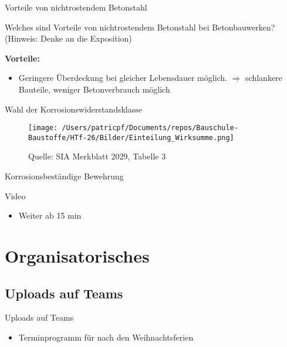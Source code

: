 \begin{frame}{Vorteile von nichtrostendem Betonstahl}
\begin{Fragenblock}
    Welches sind Vorteile von nichtrostendem Betonstahl bei Betonbauwerken? (Hinweis: Denke an die Exposition)
\end{Fragenblock}

\pause

\begin{myLösung}
    \textbf{Vorteile:}
    \begin{itemize}
        \item[\faCheckSquare] Geringere Überdeckung bei gleicher Lebensdauer möglich. $\Rightarrow$ schlankere Bauteile, weniger Betonverbrauch möglich
    \end{itemize}
\end{myLösung}
\end{frame}

\begin{frame}{Wahl der Korrosionswiderstandsklasse}

    \begin{figure}[h!bt]
        \centering
        \texttt{[image: /Users/patricpf/Documents/repos/Bauschule-Baustoffe/HTf-26/Bilder/Einteilung\_Wirksumme.png]}
        \caption{Quelle: SIA Merkblatt 2029, Tabelle 3}
    \end{figure}
    
\end{frame}


\begin{frame}{Korrosionsbeständige Bewehrung}
	\begin{block}{Video}
		\begin{itemize}
			\item [\textbullet] Weiter ab 15 min 
		\end{itemize}
	\end{block}
\end{frame}






\section{Organisatorisches}
\BlueSectionSlide

\subsection{Uploads auf Teams}
\begin{frame}{Uploads auf Teams}
	\begin{itemize}
		\item[\textbullet] Terminprogramm für nach den Weihnachtsferien
	\end{itemize}
	        
\end{frame}

        

\folieFragen


